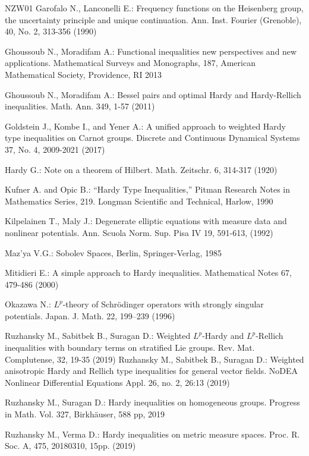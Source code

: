 \documentclass[a4paper,12pt,reqno]{amsart}
\theoremstyle{theorem}
\numberwithin{equation}{section}
\theoremstyle{plain}
\theoremstyle{definition}
\theoremstyle{defi}
\begin{document}
\begin{thebibliography}{NZW01}
Garofalo N., Lanconelli E.: Frequency functions on the Heisenberg group, the uncertainty principle and unique continuation. Ann. Inst. Fourier (Grenoble), 40, No. 2, 313-356 (1990)

Ghoussoub N., Moradifam A.: Functional inequalities new perspectives and new applications. Mathematical Surveys and Monographs, 187, American Mathematical Society, Providence, RI 2013

Ghoussoub N., Moradifam A.: Bessel pairs and optimal Hardy and Hardy-Rellich inequalities. Math. Ann. 349, 1-57 (2011) 

Goldstein J., Kombe I., and Yener A.: A unified approach to weighted Hardy type inequalities on Carnot groups. Discrete and Continuous Dynamical Systems 37, No. 4, 2009-2021 (2017)

Hardy G.: Note on a theorem of Hilbert. Math. Zeitschr. 6, 314-317 (1920)


Kufner A. and Opic B.: “Hardy Type Inequalities,” Pitman Research Notes in Mathematics Series, 219. Longman Scientific and Technical, Harlow, 1990

Kilpelainen T., Maly J.: Degenerate elliptic equations with measure data and nonlinear potentials. Ann. Scuola Norm. Sup. Pisa IV 19, 591-613, (1992)

Maz’ya V.G.:  Sobolev Spaces, Berlin, Springer-Verlag, 1985

Mitidieri E.: A simple approach to Hardy inequalities. Mathematical Notes 67, 479-486 (2000)

Okazawa N.: $L^p$-theory of Schr\"odinger operators with strongly singular potentials. Japan. J. Math. 22, 199--239 (1996)

Ruzhansky M., Sabitbek B., Suragan D.: Weighted $L^p$-Hardy and $L^p$-Rellich inequalities with boundary terms on stratified Lie groups. Rev. Mat. Complutense, 32, 19-35 (2019)
Ruzhansky M., Sabitbek B., Suragan D.: Weighted anisotropic Hardy and Rellich type inequalities for general vector fields. NoDEA Nonlinear Differential Equations Appl. 26, no. 2, 26:13 (2019)

Ruzhansky M., Suragan D.:
\newblock Hardy inequalities on homogeneous groups.
{Progress in Math.} Vol. 327, Birkh\"auser, 588 pp, 2019

Ruzhansky M., Verma D.: Hardy inequalities on metric measure spaces. Proc. R. Soc. A, 475, 20180310, 15pp. (2019)


\end{thebibliography}
\end{document}
